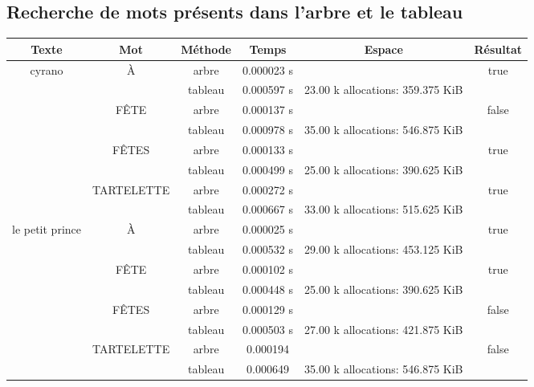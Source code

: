 \documentclass[a4paper,12pt]{article}
\begin{document}
\subsection{Recherche de mots présents dans l'arbre et le tableau}
\begin{center}
  \begin{tabular}{|c|c|c|c|c|c|}
    \hline
    Texte & Mot & Méthode & Temps & Espace & Résultat \\
    \hline
    \multirow{8}{*}{cyrano} & \multirow{2}{*}{À} & arbre & 0.000023 s &  & \multirow{2}{*}{true}\\
    \cline{3-5}
        & & tableau & 0.000597 s & 23.00 k allocations: 359.375 KiB & \\
   \cline{2-6}
    & \multirow{2}{*}{FÊTE} & arbre & 0.000137 s &  & \multirow{2}{*}{false}\\
    \cline{3-5}
        & & tableau & 0.000978 s & 35.00 k allocations: 546.875 KiB & \\
   \cline{2-6}
    & \multirow{2}{*}{FÊTES} & arbre &  0.000133 s &  & \multirow{2}{*}{true}\\
    \cline{3-5}
        & & tableau & 0.000499 s & 25.00 k allocations: 390.625 KiB & \\
   \cline{2-6}
    & \multirow{2}{*}{TARTELETTE} & arbre & 0.000272 s &  & \multirow{2}{*}{true}\\
    \cline{3-5}
        & & tableau & 0.000667 s & 33.00 k allocations: 515.625 KiB & \\
    \hline 


    \multirow{8}{*}{le petit prince} & \multirow{2}{*}{À} & arbre & 0.000025 s &  & \multirow{2}{*}{true}\\
    \cline{3-5}
        & & tableau & 0.000532 s & 29.00 k allocations: 453.125 KiB & \\
   \cline{2-6}
    & \multirow{2}{*}{FÊTE} & arbre & 0.000102 s &  & \multirow{2}{*}{true}\\
    \cline{3-5}
        & & tableau & 0.000448 s & 25.00 k allocations: 390.625 KiB & \\
   \cline{2-6}
    & \multirow{2}{*}{FÊTES}  & arbre & 0.000129 s &  & \multirow{2}{*}{false}\\
    \cline{3-5}
        &  & tableau & 0.000503 s & 27.00 k allocations: 421.875 KiB & \\
   \cline{2-6}

    & \multirow{2}{*}{TARTELETTE} & arbre & 0.000194 &  & \multirow{2}{*}{false}\\
    \cline{3-5}
        & & tableau & 0.000649 & 35.00 k allocations: 546.875 KiB & \\
    \hline 
  \end{tabular}
\end{center}
\end{document}
